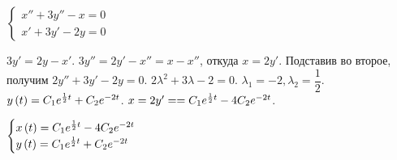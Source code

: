 \documentclass[a5paper,10pt]{article}
\begin{document}
$
\begin{cases}
    x'' + 3y'' - x = 0 \\
    x' + 3y' - 2y = 0
\end{cases}
$

$3y' = 2y - x'$. $3y'' = 2y' - x'' = x - x''$, откуда $x = 2y'$. Подставив во второе, получим $2y'' + 3y' - 2y = 0$. $2\lambda^2 + 3\lambda  - 2 = 0$. $\lambda_1 = {-2}, \lambda_{2} = \dfrac {1} {2}$. $y\left(t\right) = C_{1}  e^{\frac {1} {2} t} + C_{2} e^{-2t}$. $x = 2y' = \linebreak = C_{1}  e^{\frac {1} {2} t} - 4 C_{2} e^{-2t}$.

$
\begin{cases}
    x\left(t\right) = C_{1}  e^{\frac {1} {2} t} - 4 C_{2} e^{-2t}\\
    y\left(t\right) = C_{1}  e^{\frac {1} {2} t} + C_{2} e^{-2t}
\end{cases}
$
\end{document}
